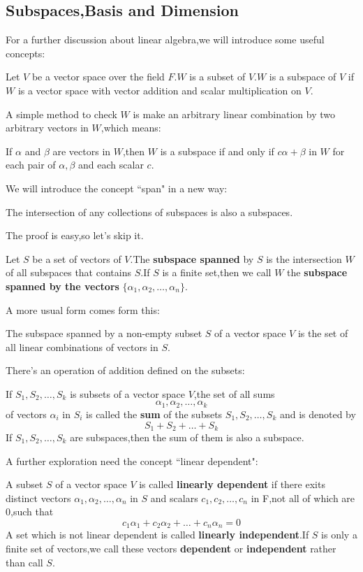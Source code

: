 \documentclass{article}
\begin{document}
\subsection{Subspaces,Basis and Dimension}
For a further discussion about linear algebra,we will introduce some useful concepts:
\begin{dde}
	Let $V$ be a vector space over the field $F$.$W$ is a subset of $V$.$W$ is a subspace of $V$ if $W$ is a vector space with vector addition and scalar multiplication on $V$.
\end{dde}
A simple method to check $W$ is make an arbitrary linear combination by two arbitrary vectors in $W$,which means:
\begin{thm}
	If $\alpha$ and $\beta$ are vectors in $W$,then $W$ is a subspace if and only if $c\alpha+\beta$ in $W$ for each pair of $\alpha,\beta$ and each scalar $c$.
\end{thm}
We will introduce the concept ``span" in a new way:
\begin{thm}
	The intersection of any collections of subspaces is also a subspaces.
\end{thm}
The proof is easy,so let's skip it.
\begin{dde}
	Let $S$ be a set of vectors of $V$.The \textbf{subspace spanned} by $S$ is the intersection $W$ of all subspaces that contains $S$.If $S$ is a finite set,then we call $W$ the \textbf{subspace spanned by the vectors} $\{\alpha_1,\alpha_2,\dots,\alpha_n\}$. 
\end{dde}
A more usual form comes form this:
\begin{thm}
	The subspace spanned by a non-empty subset $S$ of a vector space $V$ is the set of all linear combinations of vectors in $S$. 
\end{thm}
There's an operation of addition defined on the subsets:
\begin{dde}
	If $S_1,S_2,\dots,S_k$ is subsets of a vector space $V$,the set of all sums
	\[\alpha_1,\alpha_2,\dots,\alpha_k\]of vectors $\alpha_i$ in $S_i$ is called the \textbf{sum} of the subsets $S_1,S_2,\dots,S_k$ and is denoted by
	\[S_1+S_2+\dots+S_k\]If $S_1,S_2,\dots,S_k$ are subspaces,then the sum of them is also a subspace.
\end{dde}
A further exploration need the concept ``linear dependent":
\begin{dde}
	A subset $S$ of a vector space $V$ is called \textbf{linearly dependent} if there exits distinct vectors $\alpha_1,\alpha_2,\dots,\alpha_n$ in $S$ and scalars $c_1,c_2,\dots,c_n$ in F,not all of which are $0$,such that
	\[c_1\alpha_1+c_2\alpha_2+\dots+c_n\alpha_n=0\]
	A set which is not linear dependent is called \textbf{linearly independent}.If $S$ is only a finite set of vectors,we call these vectors \textbf{dependent} or \textbf{independent} rather than call $S$.
\end{dde}
\end{document}
